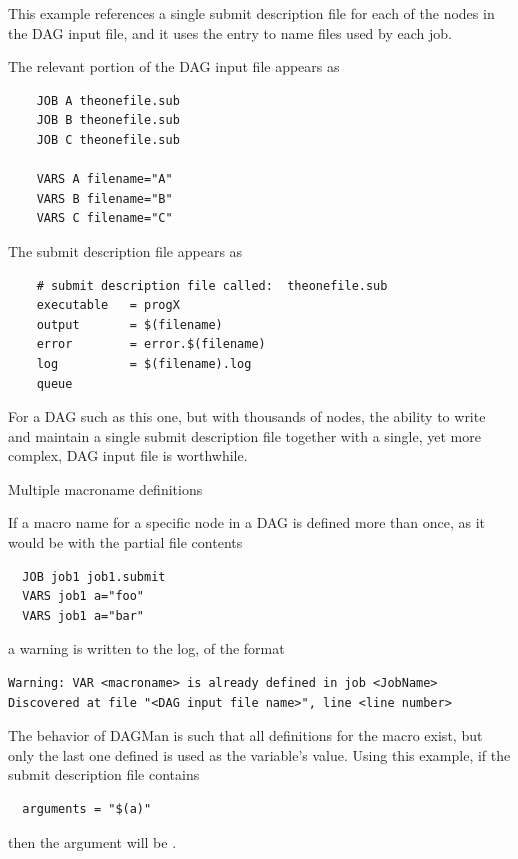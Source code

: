 This example references a single submit description file for each of
the nodes in the DAG input file, 
and it uses the  entry to name files used by each job.

The relevant portion of the DAG input file appears as 
\begin{verbatim}
    JOB A theonefile.sub
    JOB B theonefile.sub
    JOB C theonefile.sub

    VARS A filename="A"
    VARS B filename="B"
    VARS C filename="C"
\end{verbatim}

The submit description file appears as 
\footnotesize
\begin{verbatim}
    # submit description file called:  theonefile.sub
    executable   = progX
    output       = $(filename)
    error        = error.$(filename)
    log          = $(filename).log
    queue
\end{verbatim}
\normalsize

For a DAG such as this one, but with thousands of nodes,
the ability to write and maintain a single submit description file 
together with a single, yet more complex, DAG input file is worthwhile.

\begin{description}
\item[Multiple macroname definitions]
\end{description}

If a macro name for a specific node in a DAG is defined more than once,
as it would be with the partial file contents
\begin{verbatim}
  JOB job1 job1.submit
  VARS job1 a="foo"
  VARS job1 a="bar"
\end{verbatim}
a warning is written to the log, of the format 
\begin{verbatim}
Warning: VAR <macroname> is already defined in job <JobName>
Discovered at file "<DAG input file name>", line <line number>
\end{verbatim}

The behavior of DAGMan is such that all definitions for the macro exist,
but only the last one defined is used as the variable's value.
Using this example, 
if the  submit description file contains
\begin{verbatim}
  arguments = "$(a)"
\end{verbatim}
then the argument will be .

